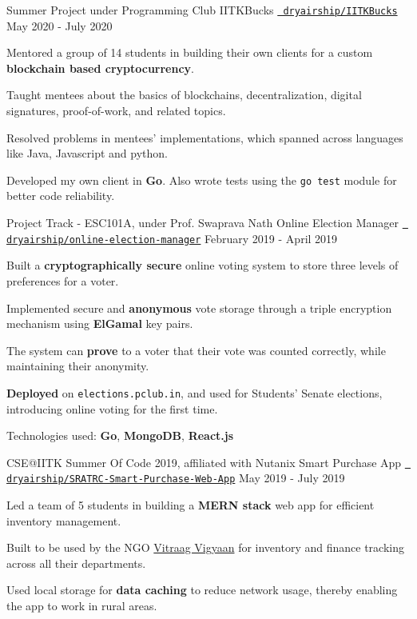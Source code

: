 
\begin{cventries}
  \cventry
  {Summer Project under Programming Club}
  {IITKBucks}
  {\texttt{\href{https://github.com/dryairship/IITKBucks}{\faGithub{} dryairship/IITKBucks}}}
  {May 2020 - July 2020}
  {
    \begin{cvitems}
      \item Mentored a group of 14 students in building their own clients for a custom \textbf{blockchain based cryptocurrency}.
      \item Taught mentees about the basics of blockchains, decentralization, digital signatures, proof-of-work, and related topics. 
      \item Resolved problems in mentees' implementations, which spanned across languages like Java, Javascript and python.
      \item Developed my own client in \textbf{Go}. Also wrote tests using the \texttt{go test} module for better code reliability.
    \end{cvitems}
  }
  
  \cventry
  {Project Track - ESC101A, under Prof. Swaprava Nath}
  {Online Election Manager}
  {\texttt{\href{https://github.com/dryairship/online-election-manager}{\faGithub{} dryairship/online-election-manager}}}
  {February 2019 - April 2019}
  {
    \begin{cvitems}
      \item Built a \textbf{cryptographically secure} online voting system to store three levels of preferences for a voter.
      \item Implemented secure and \textbf{anonymous} vote storage through a triple encryption mechanism using \textbf{ElGamal} key pairs.
      \item The system can \textbf{prove} to a voter that their vote was counted correctly, while maintaining their anonymity.
      \item \textbf{Deployed} on \texttt{elections.pclub.in}, and used for Students' Senate elections, introducing online voting for the first time.
      \item Technologies used: \textbf{Go}, \textbf{MongoDB}, \textbf{React.js}
    \end{cvitems}
  }

  \cventry
  {CSE@IITK Summer Of Code 2019, affiliated with Nutanix}
  {Smart Purchase App}
  {\texttt{\href{https://github.com/dryairship/SRATRC-Smart-Purchase-Web-App}{\faGithub{} dryairship/SRATRC-Smart-Purchase-Web-App}}}
  {May 2019 - July 2019}
  {
    \begin{cvitems}
      \item Led a team of 5 students in building a \textbf{MERN stack} web app for efficient inventory management.
      \item Built to be used by the NGO \href{https://vitraagvigyaan.org}{Vitraag Vigyaan} for  inventory and finance tracking across all their departments.
      \item Used local storage for \textbf{data caching} to reduce network usage, thereby enabling the app to work in rural areas.
    \end{cvitems}
  }
  

\end{cventries}
